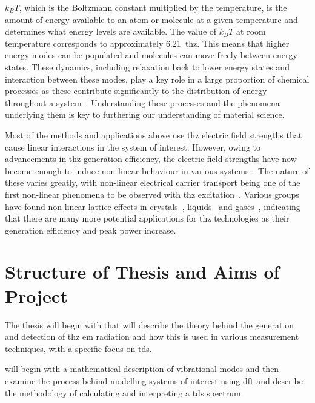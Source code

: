 \(k_BT\), which is the Boltzmann constant multiplied by the temperature, is the amount of energy available to an atom or molecule at a given temperature and determines what energy levels are available. The value of \(k_BT\) at room temperature corresponds to approximately \SI{6.21}{\acrshort{thz}}. This means that higher energy modes can be populated and molecules can move freely between energy states. These dynamics, including relaxation back to lower energy states and interaction between these modes, play a key role in a large proportion of chemical processes as these contribute significantly to the distribution of energy throughout a system~\cite{Ruggiero2016, Fujisaki2005}. Understanding these processes and the phenomena underlying them is key to furthering our understanding of material science. 

Most of the methods and applications above use \acrshort{thz} electric field strengths that cause linear interactions in the system of interest. However, owing to advancements in \acrshort{thz} generation efficiency, the electric field strengths have now become enough to induce non\nobreakdash-linear behaviour in various systems~\cite{Hwang2015}. The nature of these varies greatly, with non\nobreakdash-linear electrical carrier transport being one of the first non\nobreakdash-linear phenomena to be observed with \acrshort{thz} excitation~\cite{Ganichev2005}. Various groups have found non\nobreakdash-linear lattice effects in crystals~\cite{Hwang2015}, liquids~\cite{Hoffmann2009} and gases~\cite{Fleischer2012}, indicating that there are many more potential applications for \acrshort{thz} technologies as their generation efficiency and peak power increase. 

\section{Structure of Thesis and Aims of Project}
The thesis will begin with  that will describe the theory behind the generation and detection of \acrshort{thz} \acrshort{em} radiation and how this is used in various measurement techniques, with a specific focus on \acrshort{tds}.

 will begin with a mathematical description of vibrational modes and then examine the process behind modelling systems of interest using \acrfull{dft} and describe the methodology of calculating and interpreting a \acrshort{tds} spectrum.

